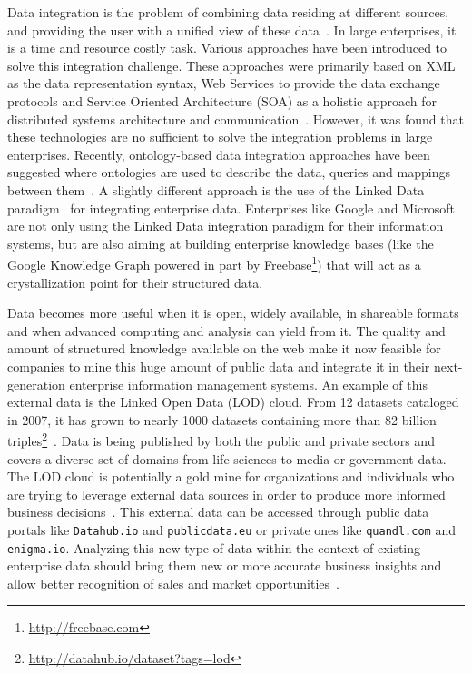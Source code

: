 Data integration is the problem of combining data residing at different sources, and providing the user with a unified view of these data~\cite{Lenzerini:SIGMOD:02}. In large enterprises, it is a time and resource costly task. Various approaches have been introduced to solve this integration challenge. These approaches were primarily based on XML as the data representation syntax, Web Services to provide the data exchange protocols and Service Oriented Architecture (SOA) as a holistic approach for distributed systems architecture and communication~\cite{Frischmuth:ISWC:13,Frischmuth:SemWebJorunal:12}. However, it was found that these technologies are no sufficient to solve the integration problems in large enterprises. Recently, ontology-based data integration approaches have been suggested where ontologies are used to describe the data, queries and mappings between them~\cite{Wache:IJCAI:01}. A slightly different approach is the use of the Linked Data paradigm~\cite{Bizer:IJSWIS:09} for integrating enterprise data. Enterprises like Google and Microsoft are not only using the Linked Data integration paradigm for their information systems, but are also aiming at building enterprise knowledge bases (like the Google Knowledge Graph powered in part by Freebase\footnote{\url{http://freebase.com}}) that will act as a crystallization point for their structured data.

Data becomes more useful when it is open, widely available, in shareable formats and when advanced computing and analysis can yield from it. The quality and amount of structured knowledge available on the web make it now feasible for companies to mine this huge amount of public data and integrate it in their next-generation enterprise information management systems. An example of this external data is the Linked Open Data (LOD) cloud. From 12 datasets cataloged in 2007, it has grown to nearly 1000 datasets containing more than 82 billion triples\footnote{\url{http://datahub.io/dataset?tags=lod}}~\cite{Bizer:IJSWIS:09}. Data is being published by both the public and private sectors and covers a diverse set of domains from life sciences to media or government data. The LOD cloud is potentially a gold mine for organizations and individuals who are trying to leverage external data sources in order to produce more informed business decisions~\cite{Boyd:Article:11}. This external data can be accessed through public data portals like \texttt{Datahub.io} and \texttt{publicdata.eu} or private ones like \texttt{quandl.com} and \texttt{enigma.io}. Analyzing this new type of data within the context of existing enterprise data should bring them new or more accurate business insights and allow better recognition of sales and market opportunities~\cite{LaValle:MIT:11}.

